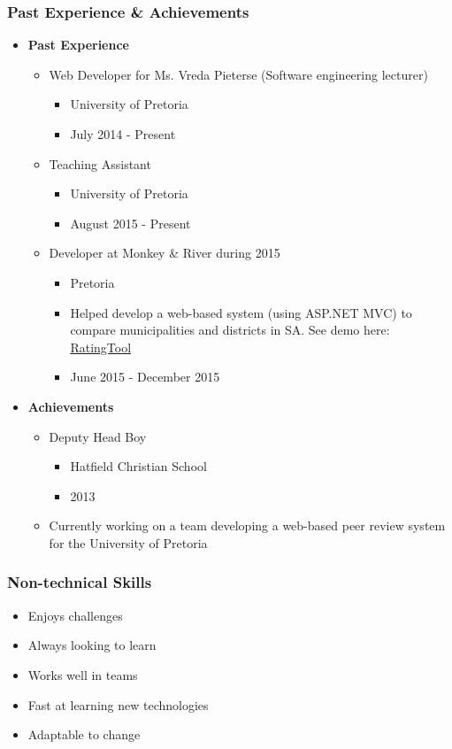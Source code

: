 \documentclass{article}
\begin{document}
\subsubsection{Past Experience \& Achievements}
			\begin{itemize}
				\item \textbf{Past Experience}
				\begin{itemize}
					\item Web Developer for Ms. Vreda Pieterse (Software engineering lecturer)
					\begin{itemize}
						\item University of Pretoria
						\item July 2014 - Present
					\end{itemize}
					\item Teaching Assistant
					\begin{itemize}
						\item University of Pretoria
						\item August 2015 - Present
					\end{itemize}
					\item Developer at Monkey \& River during 2015
					\begin{itemize}
						\item Pretoria
						\item Helped develop a web-based system (using ASP.NET MVC) to compare municipalities and districts in SA. See demo here: \href{http://salgabarometerdemo.org.za/RatingTool}{RatingTool}
						\item June 2015 - December 2015
					\end{itemize}
				\end{itemize}
				
				\item \textbf{Achievements}
				\begin{itemize}
					\item Deputy Head Boy
					\begin{itemize}
						\item Hatfield Christian School
						\item 2013
					\end{itemize}
					\item Currently working on a team developing a web-based peer review system for the University of Pretoria
				\end{itemize}
			\end{itemize}
		\subsubsection{Non-technical Skills}
			\begin{itemize}
				\item Enjoys challenges
				\item Always looking to learn
				\item Works well in teams
				\item Fast at learning new technologies
				\item Adaptable to change
			\end{itemize}
\end{document}
